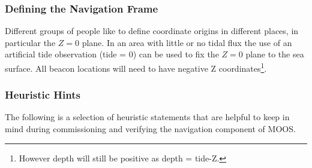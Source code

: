 \documentclass[a4paper,10pt]{article}
\begin{document}
\subsubsection{Defining the Navigation Frame}
Different groups of people like to define coordinate origins in
different places, in particular the $Z=0$ plane. In an area with
little or no tidal flux the use of an artificial tide observation
(tide = 0) can be used to fix the $Z=0$ plane to the sea surface.
All beacon locations will need to have negative Z
coordinates\footnote{ However depth will still be positive as
depth = tide-Z.}.

\subsubsection{Heuristic Hints}
The following  is a selection of heuristic statements that are
helpful to keep in mind during commissioning and verifying the
navigation component of MOOS.
\end{document}

